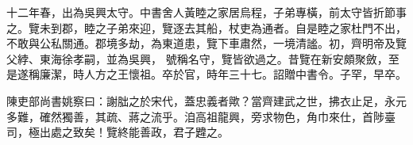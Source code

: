 \begin{pinyinscope}
 十二年春，出為吳興太守。中書舍人黃睦之家居烏程，子弟專橫，前太守皆折節事之。覽未到郡，睦之子弟來迎，覽逐去其船，杖吏為通者。自是睦之家杜門不出，不敢與公私關通。郡境多劫，為東道患，覽下車肅然，一境清謐。初，齊明帝及覽父綍、東海徐孝嗣，並為吳興，
 號稱名守，覽皆欲過之。昔覽在新安頗聚斂，至是遂稱廉潔，時人方之王懷祖。卒於官，時年三十七。詔贈中書令。子罕，早卒。



 陳吏部尚書姚察曰：謝朏之於宋代，蓋忠義者歟？當齊建武之世，拂衣止足，永元多難，確然獨善，其疏、蔣之流乎。洎高祖龍興，旁求物色，角巾來仕，首陟臺司，極出處之致矣！覽終能善政，君子韙之。



\end{pinyinscope}
